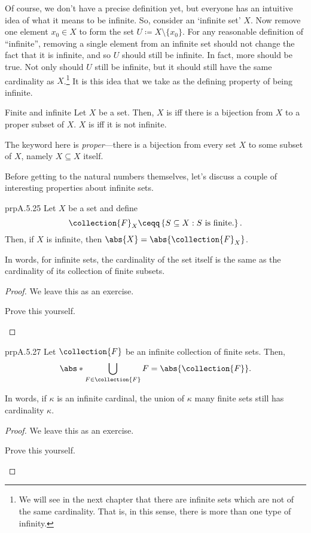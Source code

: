 Of course, we don't have a precise definition yet, but everyone has an intuitive idea of what it means to be infinite.  So, consider an `infinite set' $X$.  Now remove one element $x_0\in X$ to form the set $U\coloneqq X\setminus \{ x_0\}$.  For any reasonable definition of ``infinite'', removing a single element from an infinite set should not change the fact that it is infinite, and so $U$ should still be infinite.  In fact, more should be true.  Not only should $U$ still be infinite, but it should still have the same cardinality as $X$.\footnote{We will see in the next chapter that there are infinite sets which are not of the same cardinality.  That is, in this sense, there is more than one type of infinity.}  It is this idea that we take as the defining property of being infinite.
\begin{dfn}{Finite and infinite}{}
Let $X$ be a set.  Then, $X$ is  iff there is a bijection from $X$ to a proper subset of $X$.  $X$ is  iff it is not infinite.
\begin{rmk}
The keyword here is \emph{proper}---there is a bijection from every set $X$ to some subset of $X$, namely $X\subseteq X$ itself.
\end{rmk}
\end{dfn}
Before getting to the natural numbers themselves, let's discuss a couple of interesting properties about infinite sets.
\begin{prp}{}{prpA.5.25}
	Let $X$ be a set and define
	\begin{equation}
	\collection{F}_X\ceqq \left\{ S\subseteq X:S\text{ is finite.}\right\} .
	\end{equation}
	Then, if $X$ is infinite, then $\abs{X}=\abs{\collection{F}_X}$.
	\begin{rmk}
		In words, for infinite sets, the cardinality of the set itself is the same as the cardinality of its collection of finite subsets.
	\end{rmk}
	\begin{proof}
		We leave this as an exercise.
		\begin{exr}[breakable=false]{}{}
			Prove this yourself.
		\end{exr}
	\end{proof}
\end{prp}
\begin{prp}{}{prpA.5.27}
	Let $\collection{F}$ be an infinite collection of finite sets.  Then,
	\begin{equation}
	\abs*{\bigcup _{F\in \collection{F}}F}=\abs{\collection{F}}.
	\end{equation}
	\begin{rmk}
		In words, if $\kappa$ is an infinite cardinal, the union of $\kappa$ many finite sets still has cardinality $\kappa$.
	\end{rmk}
	\begin{proof}
		We leave this as an exercise.
		\begin{exr}[breakable=false]{}{}
			Prove this yourself.
		\end{exr}
	\end{proof}
\end{prp}
